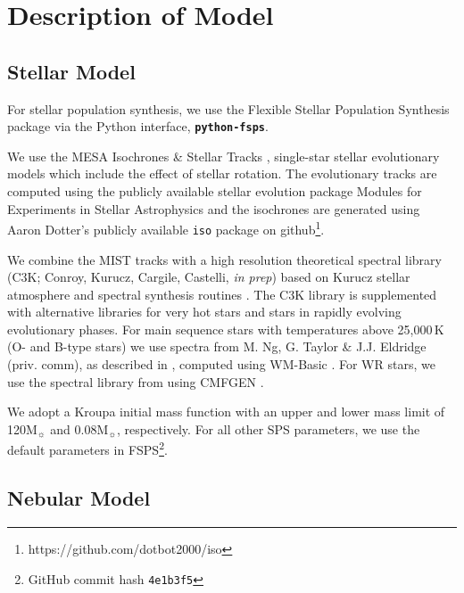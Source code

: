 \documentclass[preprint2]{aastex62}
\newcommand{\FSPS}{{\sc FSPS}\xspace}
\newcommand{\pFSPS}{{\tt \textbf{python-fsps}}\xspace}
\newcommand\Msun{\ensuremath{\mathrm{M_{\sun}}}\xspace}
\begin{document}
\section{Description of Model} \label{sec:model}

\subsection{Stellar Model} \label{sec:model:stars}

For stellar population synthesis, we use the Flexible Stellar Population Synthesis package \citep[\FSPS;][]{Conroy+2009, Conroy+2010} via the Python interface, \pFSPS \citep{pythonFSPSdfm}. 

We use the MESA Isochrones \& Stellar Tracks \citep[MIST;][]{Dotter+2016, Choi+2016}, single-star stellar evolutionary models which include the effect of stellar rotation. The evolutionary tracks are computed using the publicly available stellar evolution package Modules for Experiments in Stellar Astrophysics \citep[MESA v7503;][]{Paxton+2011,Paxton+2013, Paxton+2015} and the isochrones are generated using Aaron Dotter's publicly available \texttt{iso} package on github\footnote{https://github.com/dotbot2000/iso}.

We combine the MIST tracks with a high resolution theoretical spectral library (C3K; Conroy, Kurucz, Cargile, Castelli, \emph{in prep}) based on Kurucz stellar atmosphere and spectral synthesis routines \citep[ATLAS12 and SYNTHE,][]{Kurucz+2005}. The C3K library is supplemented with alternative libraries for very hot stars and stars in rapidly evolving evolutionary phases. For main sequence stars with temperatures above 25,000$\,$K (O- and B-type stars) we use spectra from M. Ng, G. Taylor \& J.J. Eldridge (priv. comm),  as described in \citet{Eldridge+2017}, computed using WM-Basic \citep{Pauldrach+2001}. For WR stars, we use the spectral library from \citet{Smith+2002} using CMFGEN \citep{Hillier+2001}.

We adopt a Kroupa initial mass function \citep[IMF;][]{Kroupa+2001} with an upper and lower mass limit of 120\Msun and 0.08\Msun, respectively. For all other SPS parameters, we use the default parameters in \FSPS\footnote{GitHub commit hash \texttt{4e1b3f5}}.

\subsection{Nebular Model} \label{sec:model:neb}
\end{document}

